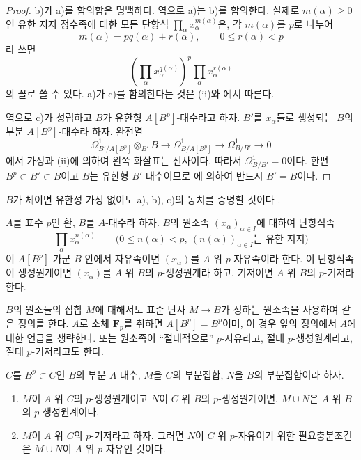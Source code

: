 \begin{proof}
b)가 a)를 함의함은 명백하다. 역으로 a)는 b)를 함의한다. 실제로
$m(\alpha)\geq0$인 유한 지지 정수족에 대한 모든 단항식
$\prod_\alpha x_\alpha^{m(\alpha)}$은, 각 $m(\alpha)$를 $p$로 나누어
\[
  m(\alpha)=p q(\alpha)+r(\alpha),\qquad 0\leq r(\alpha)<p
\]
라 쓰면
\[
  \left(\prod_\alpha x_\alpha^{q(\alpha)}\right)^p
  \prod_\alpha x_\alpha^{r(\alpha)}
\]
의 꼴로 쓸 수 있다. a)가 c)를 함의한다는 것은
(ii)와 에서 따른다.

역으로 c)가 성립하고 $B$가 유한형 $A[B^p]$-대수라고 하자. $B'$를
$x_\alpha$들로 생성되는 $B$의 부분 $A[B^p]$-대수라 하자. 완전열
\[
  \Omega^1_{B'/A[B^p]}\otimes_{B'}B\longrightarrow
  \Omega^1_{B/A[B^p]}\longrightarrow\Omega^1_{B/B'}\longrightarrow0
\]
에서 가정과 (ii)에 의하여 왼쪽 화살표는
전사이다. 따라서 $\Omega^1_{B/B'}=0$이다. 한편
$B^p\subset B'\subset B$이고 $B$는 유한형 $B'$-대수이므로
에 의하여 반드시 $B'=B$이다.
\end{proof}

\begin{remark}[21.1.8]
\label{0.21.1.8-ko}
$B$가 체이면 유한성 가정 없이도 a), b), c)의 동치를 증명할 것이다
.
\end{remark}

\begin{definition}[21.1.9]
\label{0.21.1.9-ko}
$A$를 표수 $p$인 환, $B$를 $A$-대수라 하자. $B$의 원소족
$(x_\alpha)_{\alpha\in I}$에 대하여 단항식족
\[
  \prod_\alpha x_\alpha^{n(\alpha)}
  \qquad
  \bigl(0\leq n(\alpha)<p,
  \ (n(\alpha))_{\alpha\in I}\text{는 유한 지지}\bigr)
\]
이 $A[B^p]$-가군 $B$ 안에서 자유족이면 $(x_\alpha)$를 $A$ 위
$p$-자유족이라 한다. 이 단항식족이 생성원계이면 $(x_\alpha)$를
$A$ 위 $B$의 $p$-생성원계라 하고, 기저이면 $A$ 위 $B$의
$p$-기저라 한다.
\end{definition}

$B$의 원소들의 집합 $M$에 대해서도 표준 단사 $M\to B$가 정하는
원소족을 사용하여 같은 정의를 한다. $A$로 소체 $\mathbf F_p$를
취하면 $A[B^p]=B^p$이며, 이 경우 앞의 정의에서 $A$에 대한 언급을
생략한다. 또는 원소족이 ``절대적으로'' $p$-자유라고, 절대
$p$-생성원계라고, 절대 $p$-기저라고도 한다.

\begin{lemma}[21.1.10]
\label{0.21.1.10-ko}
$C$를 $B^p\subset C$인 $B$의 부분 $A$-대수, $M$을 $C$의 부분집합,
$N$을 $B$의 부분집합이라 하자.
\begin{enumerate}
  \item[(i)] $M$이 $A$ 위 $C$의 $p$-생성원계이고 $N$이 $C$ 위
  $B$의 $p$-생성원계이면, $M\cup N$은 $A$ 위 $B$의
  $p$-생성원계이다.
  \item[(ii)] $M$이 $A$ 위 $C$의 $p$-기저라고 하자. 그러면 $N$이
  $C$ 위 $p$-자유이기 위한 필요충분조건은 $M\cup N$이 $A$ 위
  $p$-자유인 것이다.
\end{enumerate}
\end{lemma}

